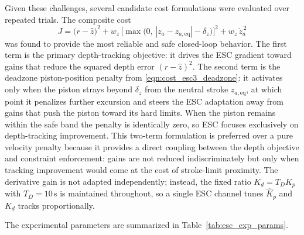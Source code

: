 ﻿\documentclass[subscriptcorrection,upint,varvw,barcolor=Goldenrod3,mathalfa=cal=euler,balance,hyphenate,french,pdf-a]{asmejour}
\begin{document}
Given these challenges, several candidate cost formulations were evaluated over repeated trials. The composite cost
\begin{equation}
    J = \bigl(r - \hat{z}\bigr)^{2}
      + w_{z}\,\bigl[\max\!\bigl(0,\,|z_{a} - z_{a,\mathrm{eq}}| - \delta_{z}\bigr)\bigr]^{2}
      + w_{\dot{z}}\,\dot{z}_{a}^{\,2}
    \label{eqn:cost_exp}
\end{equation}
was found to provide the most reliable and safe closed-loop behavior. The first term is the primary depth-tracking objective: it drives the ESC gradient toward gains that reduce the squared depth error $(r - \hat{z})^2$. The second term is the deadzone piston-position penalty from \eqref{eqn:cost_esc3_deadzone}: it activates only when the piston strays beyond $\delta_z$ from the neutral stroke $z_{a,\mathrm{eq}}$, at which point it penalizes further excursion and steers the ESC adaptation away from gains that push the piston toward its hard limits. When the piston remains within the safe band the penalty is identically zero, so ESC focuses exclusively on depth-tracking improvement. This two-term formulation is preferred over a pure velocity penalty because it provides a direct coupling between the depth objective and constraint enforcement: gains are not reduced indiscriminately but only when tracking improvement would come at the cost of stroke-limit proximity. The derivative gain is not adapted independently; instead, the fixed ratio $K_d = T_D K_p$ with $T_D = 10$\,s is maintained throughout, so a single ESC channel tunes $\hat{K}_p$ and $K_d$ tracks proportionally.

The experimental parameters are summarized in Table~\ref{tab:esc_exp_params}.
\end{document}
